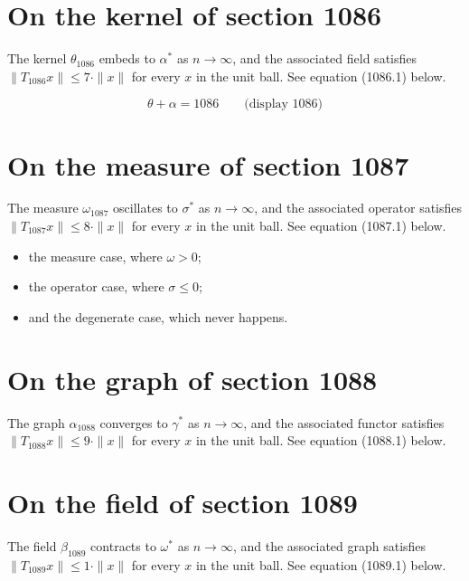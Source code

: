 \documentclass{article}
\begin{document}
\section{On the kernel of section 1086}
The kernel $\theta_{1086}$ embeds to $\alpha^{*}$ as $n \to \infty$,
and the associated field satisfies $\|T_{1086} x\| \leq 7 \cdot \|x\|$
for every $x$ in the unit ball. See equation (1086.1) below.

$$
\theta + \alpha = 1086 \qquad \text{(display 1086)}
$$

\section{On the measure of section 1087}
The measure $\omega_{1087}$ oscillates to $\sigma^{*}$ as $n \to \infty$,
and the associated operator satisfies $\|T_{1087} x\| \leq 8 \cdot \|x\|$
for every $x$ in the unit ball. See equation (1087.1) below.

\begin{itemize}
  \item the measure case, where $\omega > 0$;
  \item the operator case, where $\sigma \leq 0$;
  \item and the degenerate case, which never happens.
\end{itemize}

\section{On the graph of section 1088}
The graph $\alpha_{1088}$ converges to $\gamma^{*}$ as $n \to \infty$,
and the associated functor satisfies $\|T_{1088} x\| \leq 9 \cdot \|x\|$
for every $x$ in the unit ball. See equation (1088.1) below.

\section{On the field of section 1089}
The field $\beta_{1089}$ contracts to $\omega^{*}$ as $n \to \infty$,
and the associated graph satisfies $\|T_{1089} x\| \leq 1 \cdot \|x\|$
for every $x$ in the unit ball. See equation (1089.1) below.
\end{document}
